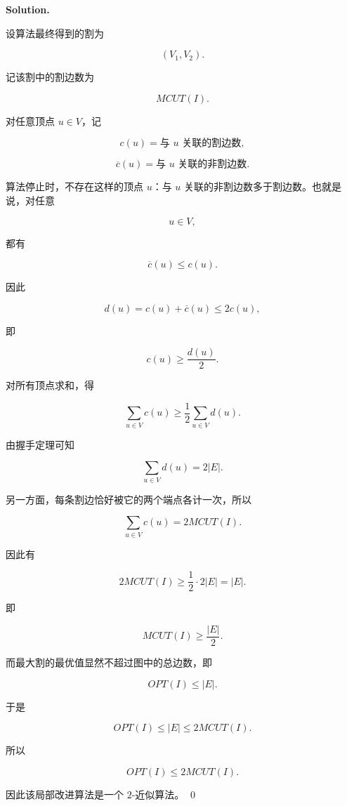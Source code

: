 \documentclass[11pt]{article}
\newenvironment{solution}{
\par\noindent\textbf{Solution.}\par\noindent
}{\qed}
\begin{document}
\begin{solution}


设算法最终得到的割为

\[
(V_1,V_2).
\]

记该割中的割边数为

\[
MCUT(I).
\]

对任意顶点 \(u\in V\)，记

\[
c(u)=\text{与 }u\text{ 关联的割边数},
\]

\[
\overline{c}(u)=\text{与 }u\text{ 关联的非割边数}.
\]

算法停止时，不存在这样的顶点 \(u\)：与 \(u\) 关联的非割边数多于割边数。也就是说，对任意

\[
u\in V,
\]

都有

\[
\overline{c}(u)\leq c(u).
\]

因此

\[
d(u)=c(u)+\overline{c}(u)\leq 2c(u),
\]

即

\[
c(u)\geq \frac{d(u)}{2}.
\]

对所有顶点求和，得

\[
\sum_{u\in V}c(u)
\geq
\frac12\sum_{u\in V}d(u).
\]

由握手定理可知

\[
\sum_{u\in V}d(u)=2|E|.
\]

另一方面，每条割边恰好被它的两个端点各计一次，所以

\[
\sum_{u\in V}c(u)=2MCUT(I).
\]

因此有

\[
2MCUT(I)
\geq
\frac12\cdot 2|E|
=
|E|.
\]

即

\[
MCUT(I)\geq \frac{|E|}{2}.
\]

而最大割的最优值显然不超过图中的总边数，即

\[
OPT(I)\leq |E|.
\]

于是

\[
OPT(I)
\leq
|E|
\leq
2MCUT(I).
\]

所以

\[
\boxed{OPT(I)\leq 2MCUT(I)}.
\]

因此该局部改进算法是一个 \(2\)-近似算法。
\end{solution}
\end{document}
